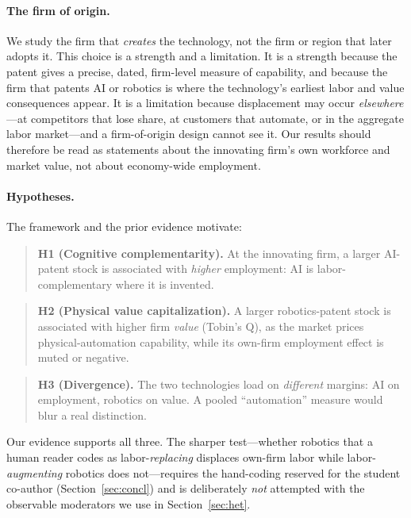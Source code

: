 \documentclass[12pt]{article}
\begin{document}
\paragraph{The firm of origin.} We study the firm that \emph{creates} the technology, not the
firm or region that later adopts it. This choice is a strength and a limitation. It is a strength
because the patent gives a precise, dated, firm-level measure of capability, and because the firm
that patents AI or robotics is where the technology's earliest labor and value consequences
appear. It is a limitation because displacement may occur \emph{elsewhere}---at competitors that
lose share, at customers that automate, or in the aggregate labor market---and a firm-of-origin
design cannot see it. Our results should therefore be read as statements about the innovating
firm's own workforce and market value, not about economy-wide employment.

\paragraph{Hypotheses.} The framework and the prior evidence motivate:
\begin{quote}
\textbf{H1 (Cognitive complementarity).} At the innovating firm, a larger AI-patent stock is
associated with \emph{higher} employment: AI is labor-complementary where it is invented.
\end{quote}
\begin{quote}
\textbf{H2 (Physical value capitalization).} A larger robotics-patent stock is associated with
higher firm \emph{value} (Tobin's Q), as the market prices physical-automation capability, while
its own-firm employment effect is muted or negative.
\end{quote}
\begin{quote}
\textbf{H3 (Divergence).} The two technologies load on \emph{different} margins: AI on employment,
robotics on value. A pooled ``automation'' measure would blur a real distinction.
\end{quote}
Our evidence supports all three. The sharper test---whether robotics that a human reader codes as
labor-\emph{replacing} displaces own-firm labor while labor-\emph{augmenting} robotics does
not---requires the hand-coding reserved for the student co-author (Section~\ref{sec:concl}) and is
deliberately \emph{not} attempted with the observable moderators we use in Section~\ref{sec:het}.
\end{document}
